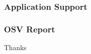 \documentclass[10pt]{beamer}
\begin{document}
\begin{frame}
	\frametitle{Application Support}
	

\end{frame}



\begin{frame}
	\frametitle{OSV Report}

\center
Thanks

\end{frame}
\end{document}
